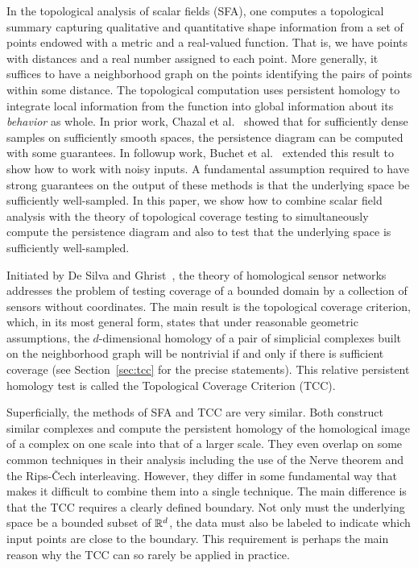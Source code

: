 
In the topological analysis of scalar fields (SFA), one computes a topological summary capturing qualitative and quantitative shape information from a set of points endowed with a metric and a real-valued function.
That is, we have points with distances and a real number assigned to each point.
More generally, it suffices to have a neighborhood graph on the points identifying the pairs of points within some distance.
The topological computation uses persistent homology to integrate local information from the function into global information about its \emph{behavior} as whole.
In prior work, Chazal et al.~\cite{chazal09analysis} showed that for sufficiently dense samples on sufficiently smooth spaces, the persistence diagram can be computed with some guarantees.
In followup work, Buchet et al.~\cite{buchet15topological} extended this result to show how to work with noisy inputs.
A fundamental assumption required to have strong guarantees on the output of these methods is that the underlying space be sufficiently well-sampled.
In this paper, we show how to combine scalar field analysis with the theory of topological coverage testing to simultaneously compute the persistence diagram and also to test that the underlying space is sufficiently well-sampled.

Initiated by De Silva and Ghrist~\cite{desilva06coordinate,desilva07coverage,desilva07homological}, the theory of homological sensor networks addresses the problem of testing coverage of a bounded domain by a collection of sensors without coordinates.
The main result is the topological coverage criterion, which, in its most general form, states that under reasonable geometric assumptions, the $d$-dimensional homology of a pair of simplicial complexes built on the neighborhood graph will be nontrivial if and only if there is sufficient coverage (see Section~\ref{sec:tcc} for the precise statements).
This relative persistent homology test is called the Topological Coverage Criterion (TCC).

Superficially, the methods of SFA and TCC are very similar.
Both construct similar complexes and compute the persistent homology of the homological image of a complex on one scale into that of a larger scale.
They even overlap on some common techniques in their analysis including the use of the Nerve theorem and the Rips-\v{C}ech interleaving.
However, they differ in some fundamental way that makes it difficult to combine them into a single technique.
The main difference is that the TCC requires a clearly defined boundary.
Not only must the underlying space be a bounded subset of $\mathbb{R}^d$, the data must also be labeled to indicate which input points are close to the boundary.
This requirement is perhaps the main reason why the TCC can so rarely be applied in practice.

